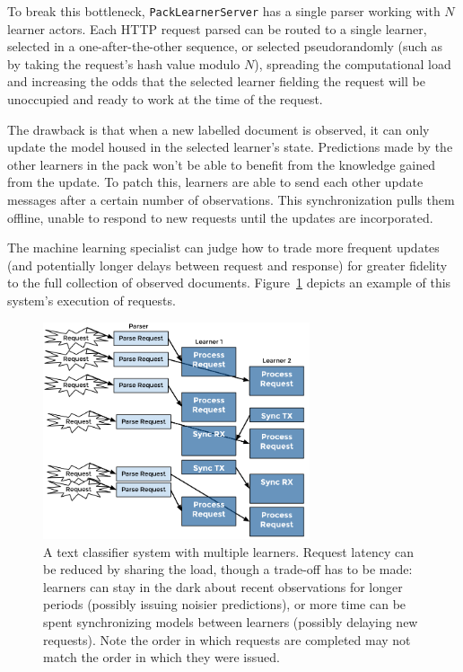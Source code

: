 \documentclass{article}
\begin{document}
To break this bottleneck, \texttt{PackLearnerServer} has a single parser working
with $N$ learner actors. Each HTTP request parsed can be routed to a single learner,
selected in a one-after-the-other sequence, or selected pseudorandomly (such as by 
taking the request's hash value modulo $N$), spreading the computational load and
increasing the odds that the selected learner fielding the request will be unoccupied and
ready to work at the time of the request. 

The drawback is that when a new labelled document is observed, it can only update
the model housed in the selected learner's state. Predictions made by the other
learners in the pack won't be able to benefit from the knowledge gained from the 
update. To patch this, learners are able to send each other update messages
after a certain number of observations. This synchronization pulls them offline, unable
to respond to new requests until the updates are incorporated. 

The machine learning specialist can judge how to trade more frequent updates (and 
potentially longer delays between request and response) for greater fidelity to the full 
collection of observed documents. Figure~\ref{fig_txt_cls_dbl} depicts an example of 
this system's execution of requests.

\begin{figure}[h]
\includegraphics[width=0.7\textwidth]{fig/tex/double_txt_cls.png}
\centering
\caption{A text classifier system with multiple learners. Request latency can be reduced
by sharing the load, though a trade-off has to be made: learners can stay in the dark 
about recent observations for longer periods (possibly issuing noisier predictions), or 
more time can be spent synchronizing models between learners (possibly delaying 
new requests). Note the order in which requests are completed may not match the 
order in which they were issued.}
\label{fig_txt_cls_dbl}
\end{figure}
\end{document}
